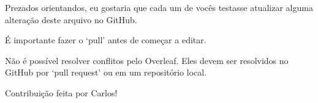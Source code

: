 \documentclass{article}
\begin{document}
Prezados orientandos,
eu gostaria que cada um de vocês testasse atualizar alguma alteração deste arquivo no GitHub.

É importante fazer o `pull' antes de começar a editar.

Não é possível resolver conflitos pelo Overleaf.
Eles devem ser resolvidos no GitHub por `pull request' ou em um repositório local.

Contribuição feita por Carlos!
\end{document}

